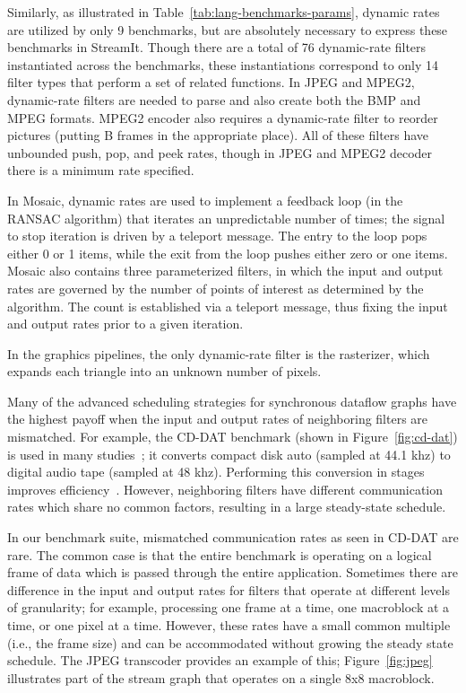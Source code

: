 Similarly, as illustrated in Table~\ref{tab:lang-benchmarks-params},
dynamic rates are utilized by only 9 benchmarks, but are absolutely
necessary to express these benchmarks in StreamIt.  Though there are a
total of 76 dynamic-rate filters instantiated across the benchmarks,
these instantiations correspond to only 14 filter types that perform a
set of related functions.  In JPEG and MPEG2, dynamic-rate filters are
needed to parse and also create both the BMP and MPEG formats.  MPEG2
encoder also requires a dynamic-rate filter to reorder pictures
(putting B frames in the appropriate place).  All of these filters
have unbounded push, pop, and peek rates, though in JPEG and MPEG2
decoder there is a minimum rate specified.

In Mosaic, dynamic rates are used to implement a feedback loop (in the
RANSAC algorithm) that iterates an unpredictable number of times; the
signal to stop iteration is driven by a teleport message.  The entry
to the loop pops either 0 or 1 items, while the exit from the loop
pushes either zero or one items.  Mosaic also contains three
parameterized filters, in which the input and output rates are
governed by the number of points of interest as determined by the
algorithm.  The count is established via a teleport message, thus
fixing the input and output rates prior to a given iteration.

In the graphics pipelines, the only dynamic-rate filter is the
rasterizer, which expands each triangle into an unknown number of
pixels.

  Many of
  the advanced scheduling strategies for synchronous dataflow graphs
  have the highest payoff when the input and output rates of
  neighboring filters are mismatched.  For example, the CD-DAT
  benchmark (shown in Figure~\ref{fig:cd-dat}) is used in many
  studies~\cite{murthy_minimizing_1994,bhattacharyya_optimal_1995,teich_3d_1999,bhattacharya_quasi-static_2000,chandrachoodan_efficient_2001,murthy_buffer_2004,ko_memory-constrained_2006};
  it converts compact disk auto (sampled at 44.1 khz) to digital audio
  tape (sampled at 48 khz).  Performing this conversion in stages
  improves efficiency~\cite{murthy_minimizing_1994}.  However,
  neighboring filters have different communication rates which share
  no common factors, resulting in a large steady-state schedule.

  In our benchmark suite, mismatched communication rates as seen in
  CD-DAT are rare.  The common case is that the entire benchmark is
  operating on a logical frame of data which is passed through the
  entire application.  Sometimes there are difference in the input and
  output rates for filters that operate at different levels of
  granularity; for example, processing one frame at a time, one
  macroblock at a time, or one pixel at a time.  However, these rates
  have a small common multiple (i.e., the frame size) and can be
  accommodated without growing the steady state schedule.  The JPEG
  transcoder provides an example of this; Figure~\ref{fig:jpeg}
  illustrates part of the stream graph that operates on a single 8x8
  macroblock.

